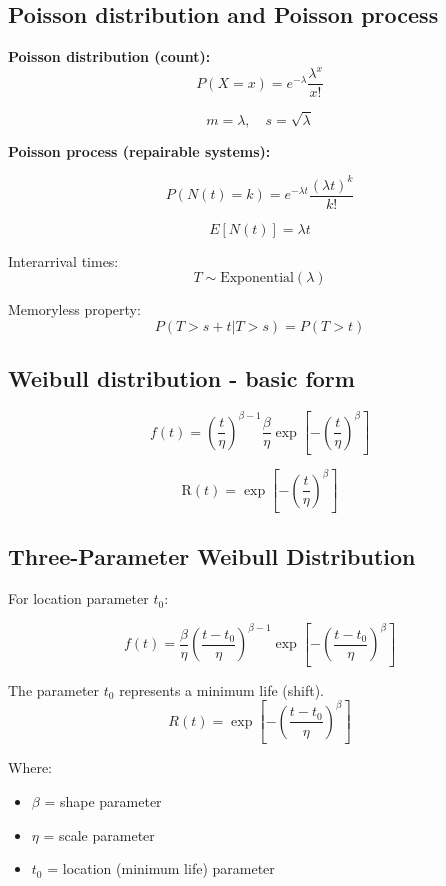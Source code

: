 \documentclass[10pt,a4paper,twocolumn]{article}
\newcommand{\R}{\mathrm{R}}
\begin{document}
\subsection*{Poisson distribution and Poisson process}

\textbf{Poisson distribution (count):}
\[P(X=x)=e^{-\lambda}\frac{\lambda^x}{x!}\]

\[m=\lambda,\quad s=\sqrt{\lambda}\]

\textbf{Poisson process (repairable systems):}

\[P(N(t)=k)=e^{-\lambda t}\frac{(\lambda t)^k}{k!}\]

\[E[N(t)]=\lambda t\]

Interarrival times:
\[T \sim \text{Exponential}(\lambda)\]

Memoryless property:
\[P(T>s+t|T>s)=P(T>t)\]

\subsection*{Weibull distribution - basic form}

\[f(t)=\left(\frac{t}{\eta}\right)^{\beta-1} \frac{\beta}{\eta} \exp\left[-\left(\frac{t}{\eta}\right)^\beta\right]\]

\[\R(t)=\exp\left[-\left(\frac{t}{\eta}\right)^\beta\right]\]

\subsection*{Three-Parameter Weibull Distribution}

For location parameter $t_0$:

\[
f(t)=\frac{\beta}{\eta} \left(\frac{t-t_0}{\eta}\right)^{\beta-1}\exp\left[-\left(\frac{t-t_0}{\eta}\right)^\beta\right]\]

The parameter $t_0$ represents a minimum life (shift).
\[
R(t)=\exp\left[-\left(\frac{t-t_0}{\eta}\right)^\beta\right]
\]

Where:
\begin{itemize}
\item $\beta$ = shape parameter
\item $\eta$ = scale parameter
\item $t_0$ = location (minimum life) parameter
\end{itemize}


\end{document}
